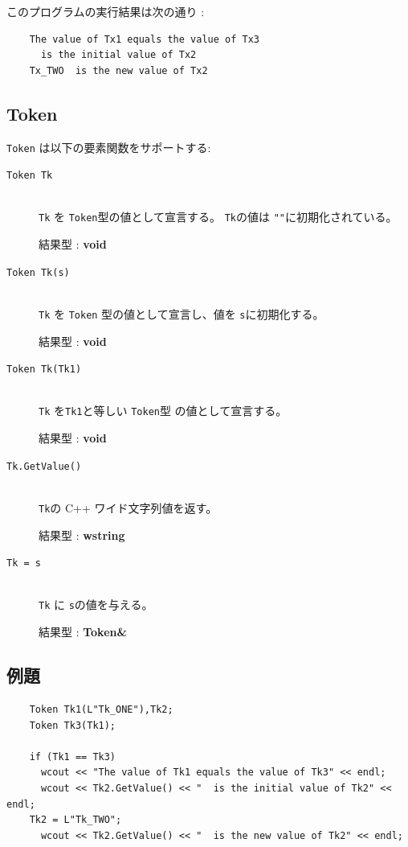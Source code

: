 \documentclass[\pformat,12pt]{jarticle}
\begin{document}
\noindent このプログラムの実行結果は次の通り :

\begin{verbatim}
    The value of Tx1 equals the value of Tx3
      is the initial value of Tx2
    Tx_TWO  is the new value of Tx2
\end{verbatim}


\subsection{Token}
{\tt Token} は以下の要素関数をサポートする:

\vspace{0.5cm}

\begin{description}
\item[{\tt Token Tk}] \mbox{}\\
      {\tt Tk} を {\tt Token}型の値として宣言する。 {\tt Tk}の値は {\tt ""}に初期化されている。

     結果型 : {\bf void}

\item[{\tt Token Tk(s)}] \mbox{}\\
      {\tt Tk} を {\tt Token} 型の値として宣言し、値を {\tt s}に初期化する。

     結果型 : {\bf void}

\item[{\tt Token Tk(Tk1)}] \mbox{}\\
      {\tt Tk} を{\tt Tk1}と等しい {\tt Token}型 の値として宣言する。

     結果型 : {\bf void}

\item[{\tt Tk.GetValue()}] \mbox{}\\
      {\tt Tk}の C++ ワイド文字列値を返す。

     結果型 : {\bf wstring}

\item[{\tt Tk = s}] \mbox{}\\
      {\tt Tk} に {\tt s}の値を与える。

     結果型 : {\bf Token\&}
\end{description}

\subsection*{例題}

\begin{verbatim}
    Token Tk1(L"Tk_ONE"),Tk2;
    Token Tk3(Tk1);

    if (Tk1 == Tk3)
      wcout << "The value of Tk1 equals the value of Tk3" << endl;
      wcout << Tk2.GetValue() << "  is the initial value of Tk2" << endl;
    Tk2 = L"Tk_TWO";
      wcout << Tk2.GetValue() << "  is the new value of Tk2" << endl;
\end{verbatim}
\end{document}
